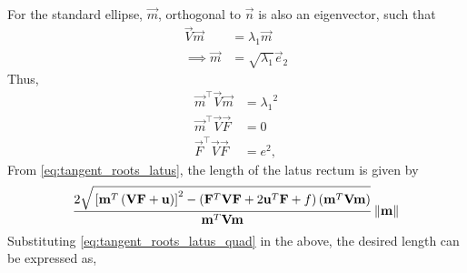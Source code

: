 \documentclass[journal,12pt,twocolumn]{IEEEtran}
\renewcommand\thesection{\arabic{section}}
\renewcommand\thesubsection{\thesection.\arabic{subsection}}
\begin{document}
\begin{enumerate}[label=\thesubsection.\arabic*.,ref=\thesubsection.\theenumi]
\begin{enumerate}
\begin{align}
\end{align}
For the standard ellipse, $\vec{m}$, orthogonal to $\vec{n}$ is also an eigenvector, such that 
\begin{align}
	\vec{V}\vec{m} &= {\lambda_1}\vec{m}  
	\\
	\implies\vec{m} &=  \sqrt{\lambda_1}\vec{e}_2
\end{align}
Thus, 
\begin{align}
	\vec{m}^{\top}\vec{V}\vec{m} &= {\lambda_1}^2
	\\
	\vec{m}^{\top}\vec{V}\vec{F} &= 0
	\\
	\vec{F}^{\top}\vec{V}\vec{F} &=e^2 
\label{eq:tangent_roots_latus_quad},
\end{align}
From 
\eqref{eq:tangent_roots_latus},
the length of the latus rectum is given by 
{\tiny
\begin{multline}
 \frac{2\sqrt{
{}\left[
\mathbf{m}^T\left(\mathbf{V}\mathbf{F}+\mathbf{u}\right)
\right]^2
-
\left(
\mathbf{F}^T\mathbf{V}\mathbf{F} + 2\mathbf{u}^T\mathbf{F} +f
\right)
\left(\mathbf{m}^T\mathbf{V}\mathbf{m}\right)
}
}
{
\mathbf{m}^T\mathbf{V}\mathbf{m}
}\left\lVert\mathbf{m}\right\rVert
\end{multline}
}
Substituting \eqref{eq:tangent_roots_latus_quad} in the above, the desired length can be expressed as,
\end{enumerate}


\end{enumerate}
\end{document}
